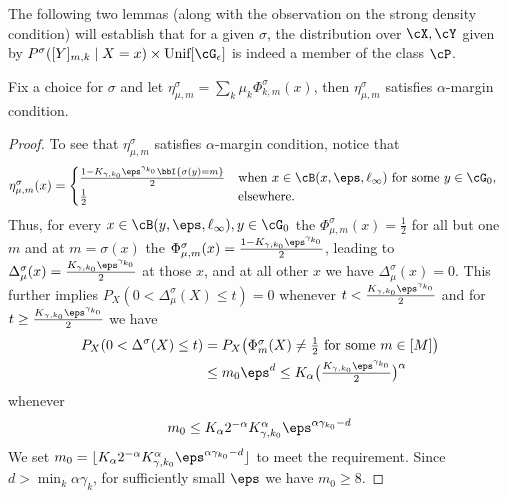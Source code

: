 The following two lemmas (along with the observation on the strong density condition) will establish that for a given $\sigma$, the distribution over $\cX, \cY$ given by $P^\sigma([Y]_{m, k} \mid X = x) \times \text{Unif}[\cG_{\epsilon}]$ is indeed a member of the class $\cP$.
\begin{lemma}
    \label{lem: margin condition}
    Fix a choice for $\sigma$ and let $\eta_{\mu, m}^\sigma = \sum_k \mu_k \Phi_{k,m}^{\sigma}(x)$, then $\eta_{\mu, m}^\sigma $ satisfies $\alpha$-margin condition.
\end{lemma}
\begin{proof}
To see that $\eta_{\mu, m}^\sigma $ satisfies $\alpha$-margin condition, notice that
\[
\begin{aligned}
    & \textstyle \eta_{\mu, m}^\sigma(x) = \begin{cases}
     \frac{1 - K_{\gamma, k_0} \eps^{\gamma_{k_0}} \bbI\{\sigma(y) = m\}}{2} & \text{when} ~  x \in\cB(x, \eps, \ell_{\infty})~ \text{for some}   ~  y \in \cG_0,\\
     \frac{1}{2} & \text{elsewhere.}
    \end{cases}
\end{aligned}
\]
Thus, for every $x \in \cB(y, \eps, \ell_\infty), y \in \cG_0$ the $\Phi_{\mu, m}^\sigma(x) = \frac12$ for all but one $m$ and at $m = \sigma(x)$ the $\Phi_{\mu, m}^\sigma(x) = \frac{1 - K_{\gamma, k_0} \eps^{\gamma_{k_0}} }{2}$, leading to $\Delta_\mu^\sigma (x)  = \frac{K_{\gamma, k_0} \eps^{\gamma_{k_0}} }{2}$ at those $x$, and at all other $x$ we have $\Delta_\mu^\sigma(x) =0$. This further implies $P_X(0 < \Delta_\mu^\sigma(X) \le t) = 0 $ whenever $t < \frac{K_{\gamma, k_0} \eps^{\gamma_{k_0}} }{2} $ and for $t \ge \frac{K_{\gamma, k_0} \eps^{\gamma_{k_0}} }{2} $ we have 
\[
\begin{aligned}
   P_X(0 < \Delta^\sigma(X) \le t) & \textstyle = P_X\big ( \Phi_m^\sigma(X) \neq \frac12 \text{ for some } m \in [M]\big ) \\
   & \textstyle \le m_0 \eps^d \le K_\alpha\big(\frac{K_{\gamma, k_0} \eps^{\gamma_{k_0}} }{2}\big)^\alpha 
\end{aligned}
\] whenever
\[
\begin{aligned}
    m_0  \textstyle \le  K_\alpha 2^{-\alpha}   K_{\gamma, k_0}^\alpha \eps^{ \alpha \gamma_{k_0} -d}
\end{aligned}
\] We set $m_0 = \lfloor K_\alpha 2^{-\alpha}   K_{\gamma, k_0}^\alpha \eps^{ \alpha \gamma_{k_0} -d} \rfloor$ to meet the requirement.
Since $d > \min_{k} \alpha\gamma_{k}$, for sufficiently small  $\eps$ we have $m_0 \ge 8$. 
\end{proof}
